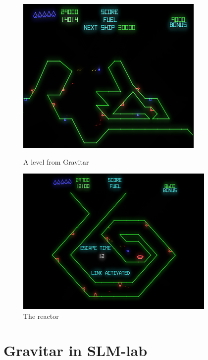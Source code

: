 \documentclass[12pt,a4paper]{report}
\begin{document}
		 \pagebreak
		 
		\begin{figure}[ht!]
			\begin{minipage}[c]{0.5\linewidth}
				\centering
				\includegraphics[height=0.3\textheight, width=0.9\linewidth]{Gravitar2.png}
				\caption{A level from Gravitar}
			\end{minipage}\hfill
			\begin{minipage}[c]{0.5\linewidth}	
				\centering
				\includegraphics[height=0.3\textheight, width=0.9\linewidth]{Reactor.png}
				\caption{The reactor}
			\end{minipage}
		\end{figure}
	
		\section{Gravitar in SLM-lab}
		
\end{document}
